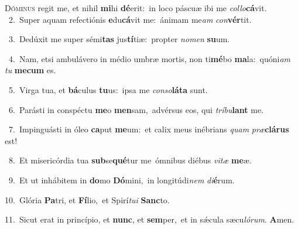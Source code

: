 \lettrine{\initial\textcolor{\initialcolor}{D}}{óminus} regit me, et nihil \textbf{mi}\-hi \textbf{dé}\-erit:~\star in loco páscuæ ibi me \textit{col}\-\textit{lo}\textbf{cá}vit.\\
{\numbfont\textcolor{\numbcolor}{~2.}}~Super aquam refectiónis \textbf{e}\-du\-\textbf{cá}\-vit me:~\star ánimam me\textit{am} \textit{con}\-\textbf{vér}tit.\par
{\numbfont\textcolor{\numbcolor}{~3.}}~Dedúxit me super sémi\textbf{tas} jus\-\textbf{tí}\-tiæ:~\star propter \textit{no}\-\textit{men} \textbf{su}\-um.\par
{\numbfont\textcolor{\numbcolor}{~4.}}~Nam, etsi ambulávero in médio umbræ mortis, non ti\-\textbf{mé}\-bo \textbf{ma}\-la:~\star quóni\textit{am} \textit{tu} \textbf{me}\-\textbf{cum} es.\par
{\numbfont\textcolor{\numbcolor}{~5.}}~Virga tua, et \textbf{bá}\-culus \textbf{tu}\-us:~\star ipsa me \textit{con}\-\textit{so}\textbf{lá}\textbf{ta} sunt.\par
{\numbfont\textcolor{\numbcolor}{~6.}}~Parásti in conspéctu \textbf{me}\-o \textbf{men}\-sam,~\star advérsus eos, qui \textit{trí}\-\textit{bu}\textbf{lant} me.\par
{\numbfont\textcolor{\numbcolor}{~7.}}~Impinguásti in óleo \textbf{ca}\-put \textbf{me}\-um:~\star et calix meus inébrians \textit{quam} \textit{præ}\-\textbf{clá}\textbf{rus} est!\par
{\numbfont\textcolor{\numbcolor}{~8.}}~Et misericórdia tua \textbf{sub}\-se\-\textbf{qué}\-tur me~\star ómnibus diébus \textit{vi}\-\textit{tæ} \textbf{me}\-æ.\par
{\numbfont\textcolor{\numbcolor}{~9.}}~Et ut inhábitem in \textbf{do}\-mo \textbf{Dó}\-mini,~\star in longitúdi\textit{nem} \textit{di}\-\textbf{é}rum.\par
{\numbfont\textcolor{\numbcolor}{10.}}~Glória \textbf{Pa}\-tri, et \textbf{Fí}\-lio,~\star et Spirí\-\textit{tu}\-\textit{i} \textbf{Sanc}\-to.\par
{\numbfont\textcolor{\numbcolor}{11.}}~Sicut erat in princípio, et \textbf{nunc}\-, et \textbf{sem}\-per,~\star et in sǽcula sæcu\-\textit{ló}\-\textit{rum}. \textbf{A}\-men.\par

